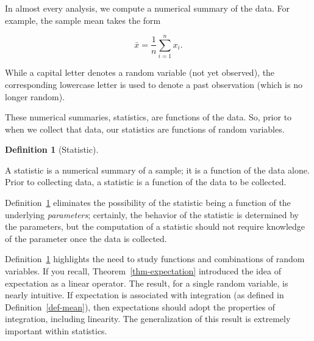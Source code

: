 \documentclass[
  letterpaper,
  DIV=11,
  numbers=noendperiod]{scrreprt}
\theoremstyle{definition}
\newtheorem{definition}{Definition}[chapter]
\theoremstyle{plain}
\theoremstyle{definition}
\theoremstyle{remark}
\begin{document}
In almost every analysis, we compute a numerical summary of the data.
For example, the sample mean takes the form

\[\bar{x} = \frac{1}{n} \sum_{i=1}^{n} x_i.\]

\begin{tcolorbox}[enhanced jigsaw, breakable, colframe=quarto-callout-note-color-frame, titlerule=0mm, arc=.35mm, coltitle=black, opacitybacktitle=0.6, leftrule=.75mm, opacityback=0, left=2mm, toprule=.15mm, colbacktitle=quarto-callout-note-color!10!white, title=\textcolor{quarto-callout-note-color}{\faInfo}\hspace{0.5em}{Note}, bottomtitle=1mm, toptitle=1mm, rightrule=.15mm, bottomrule=.15mm, colback=white]

While a capital letter denotes a random variable (not yet observed), the
corresponding lowercase letter is used to denote a past observation
(which is no longer random).

\end{tcolorbox}

These numerical summaries, statistics, are functions of the data. So,
prior to when we collect that data, our statistics are functions of
random variables.

\begin{definition}[Statistic]\protect\hypertarget{def-statistic}{}\label{def-statistic}

A statistic is a numerical summary of a sample; it is a function of the
data alone. Prior to collecting data, a statistic is a function of the
data to be collected.

\end{definition}

Definition~\ref{def-statistic} eliminates the possibility of the
statistic being a function of the underlying \emph{parameters};
certainly, the behavior of the statistic is determined by the
parameters, but the computation of a statistic should not require
knowledge of the parameter once the data is collected.

Definition~\ref{def-statistic} highlights the need to study functions
and combinations of random variables. If you recall,
Theorem~\ref{thm-expectation} introduced the idea of expectation as a
linear operator. The result, for a single random variable, is nearly
intuitive. If expectation is associated with integration (as defined in
Definition~\ref{def-mean}), then expectations should adopt the
properties of integration, including linearity. The generalization of
this result is extremely important within statistics.
\end{document}
